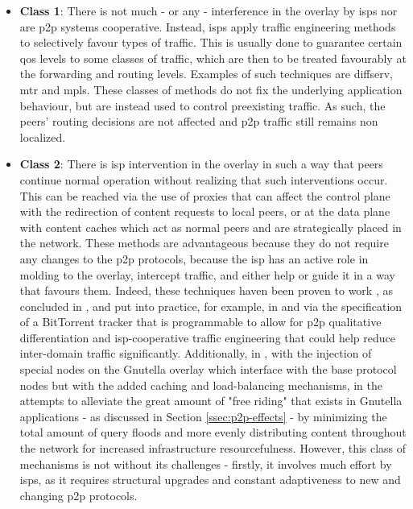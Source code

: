     \begin{itemize}
        \item \textbf{Class 1}:
            There is not much - or any - interference in the overlay by \glspl{isp} nor are \gls{p2p} systems cooperative.
            Instead, \glspl{isp} apply traffic engineering methods to selectively favour types of traffic.
            This is usually done to guarantee certain \gls{qos} levels to some classes of traffic, which are then to be treated favourably at the forwarding and routing levels.
            Examples of such techniques are \gls{diffserv}, \gls{mtr} and \gls{mpls}.
            These classes of methods do not fix the underlying application behaviour, but are instead used to control preexisting traffic.
            As such, the peers' routing decisions are not affected and \gls{p2p} traffic still remains non localized.
        \item \textbf{Class 2}:
            There is \gls{isp} intervention in the overlay in such a way that peers continue normal operation without realizing that such interventions occur.
            This can be reached via the use of proxies that can affect the control plane with the redirection of content requests to local peers, or at the data plane with content caches which act as normal peers and are strategically placed in the network.
            These methods are advantageous because they do not require any changes to the \gls{p2p} protocols, because the \gls{isp} has an active role in molding to the overlay, intercept traffic, and either help or guide it in a way that favours them.
            Indeed, these techniques haven been proven to work , as concluded in \cite{dan-Commag10}, and put into practice, for example, in \cite{programmable-trackers} and \cite{configurable-trackers} via the specification of a BitTorrent tracker that is programmable to allow for \gls{p2p} qualitative differentiation and \gls{isp}-cooperative traffic engineering that could help reduce inter-domain traffic significantly.
            Additionally, in \cite{altruistic-gnutella}, with the injection of special nodes on the Gnutella overlay which interface with the base protocol nodes but with the added caching and load-balancing mechanisms, in the attempts to alleviate the great amount of "free riding" that exists in Gnutella applications - as discussed in Section \ref{ssec:p2p-effects} - by minimizing the total amount of query floods and more evenly distributing content throughout the network for increased infrastructure resourcefulness.
            However, this class of mechanisms is not without its challenges - firstly, it involves much effort by \glspl{isp}, as it requires structural upgrades and constant adaptiveness to new and changing \gls{p2p} protocols.

\end{itemize}
